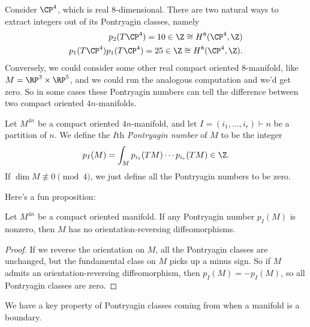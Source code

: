 \documentclass[11pt]{book}
\begin{document}
\begin{example} Consider $\CP^4$, which is real 8-dimensional. There are two natural ways to extract integers out of its Pontryagin classes, namely
\begin{align*}
    p_2(T\CP^4) = 10\in \Z \cong H^8(\CP^4,\Z) \\
    p_1(T\CP^4)p_1(T\CP^4) = 25 \in \Z \cong H^8(\CP^4,\Z).
\end{align*}
Conversely, we could consider some other real compact oriented 8-manifold, like $M = \RP^3 \times \RP^5$, and we could run the analogous computation and we'd get zero. So in some cases these Pontryagin numbers can tell the difference between two compact oriented $4n$-manifolds.
\end{example}

\begin{definition}\label{def:Pontryagin-numbers} Let $M^{4n}$ be a compact oriented $4n$-manifold, and let $I = (i_1, \ldots, i_r) \vdash n$ be a partition of $n$. We define the $I$th \emph{Pontryagin number} of $M$ to be the integer
\begin{align*}
    p_I(M) = \int_M p_{i_1}(TM) \cdots p_{i_r}(TM) \in \Z.
\end{align*}
If $\dim M \not\equiv 0 \pmod{4}$, we just define all the Pontryagin numbers to be zero.
\end{definition}

Here's a fun proposition:

\begin{proposition}
Let $M^{4n}$ be a compact oriented manifold. If any Pontryagin number $p_I(M)$ is nonzero, then $M$ has no orientation-reversing diffeomorphisms.
\end{proposition}
\begin{proof} If we reverse the orientation on $M$, all the Pontryagin classes are unchanged, but the fundamental class on $M$ picks up a minus sign. So if $M$ admits an orientation-reversing diffeomorphism, then $p_I(M) = - p_I(M)$, so all Pontryagin classes are zero.
\end{proof}

We have a key property of Pontryagin classes coming from when a manifold is a boundary. 
\end{document}
